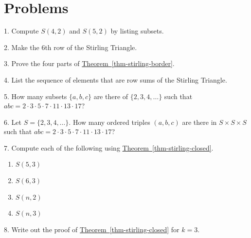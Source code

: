 \documentclass[10pt,]{book}
\theoremstyle{plain}
\theoremstyle{definition}
\theoremstyle{definition}
\numberwithin{equation}{chapter}
\begin{document}
\section[{Problems}]{Problems}\label{exercises-3}
\begin{exerciselist}
\item[1.]\hypertarget{exercise-43}{}\hypertarget{p-130}{}%
Compute \(S(4,2)\) and \(S(5,2)\) by listing subsets.%
\par\smallskip
\item[2.]\hypertarget{exercise-44}{}\hypertarget{p-131}{}%
Make the 6th row of the Stirling Triangle.%
\par\smallskip
\item[3.]\hypertarget{exercise-45}{}\hypertarget{p-132}{}%
Prove the four parts of \hyperref[thm-stirling-border]{Theorem~\ref{thm-stirling-border}}.%
\par\smallskip
\item[4.]\hypertarget{exercise-46}{}\hypertarget{p-133}{}%
List the sequence of elements that are row sums of the Stirling Triangle.%
\par\smallskip
\item[5.]\hypertarget{exercise-47}{}\hypertarget{p-134}{}%
How many subsets \(\{a,b,c\}\) are there of \(\{2,3,4,\ldots\}\) such that \(abc = 2 \cdot 3 \cdot 5 \cdot 7 \cdot 11 \cdot 13 \cdot 17\)?%
\par\smallskip
\item[6.]\hypertarget{exercise-48}{}\hypertarget{p-135}{}%
Let \(S = \{2,3,4,\ldots\}\).  How many ordered triples \((a,b,c)\) are there in \(S\times S \times S\) such that \(abc = 2 \cdot 3 \cdot 5 \cdot 7 \cdot 11 \cdot 13 \cdot 17\)?%
\par\smallskip
\item[7.]\hypertarget{exercise-49}{}\hypertarget{p-136}{}%
Compute each of the following using \hyperref[thm-stirling-closed]{Theorem~\ref{thm-stirling-closed}}. \leavevmode%
\begin{enumerate}[label=(\alph*)]
\item\hypertarget{li-22}{}\(S(5,3)\)%
\item\hypertarget{li-23}{}\(S(6,3)\)%
\item\hypertarget{li-24}{}\(S(n,2)\)%
\item\hypertarget{li-25}{}\(S(n,3)\)%
\end{enumerate}
%
\par\smallskip
\item[8.]\hypertarget{exercise-50}{}\hypertarget{p-137}{}%
Write out the proof of \hyperref[thm-stirling-closed]{Theorem~\ref{thm-stirling-closed}} for \(k=3\).%

\end{exerciselist}
\end{document}
